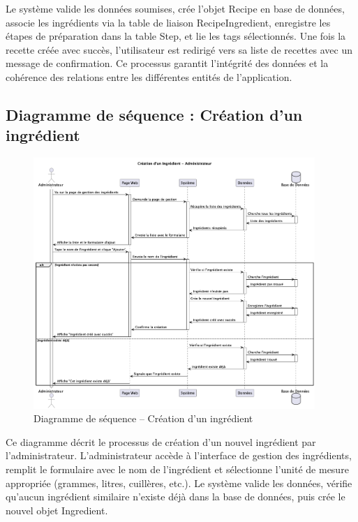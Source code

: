 \documentclass[12pt,a4paper]{report}
\begin{document}
Le système valide les données soumises, crée l'objet Recipe en base de données, associe les ingrédients via la table de liaison RecipeIngredient, enregistre les étapes de préparation dans la table Step, et lie les tags sélectionnés. Une fois la recette créée avec succès, l'utilisateur est redirigé vers sa liste de recettes avec un message de confirmation. Ce processus garantit l'intégrité des données et la cohérence des relations entre les différentes entités de l'application.

\subsection{Diagramme de séquence : Création d'un ingrédient}

\begin{figure}[H]
    \centering
    \includegraphics[width=0.95\textwidth]{sequence_diagram_creation_ingredient.png}
    \caption{Diagramme de séquence – Création d'un ingrédient}
    \label{fig:sequence_creation_ingredient}
\end{figure}

Ce diagramme décrit le processus de création d'un nouvel ingrédient par l'administrateur. L'administrateur accède à l'interface de gestion des ingrédients, remplit le formulaire avec le nom de l'ingrédient et sélectionne l'unité de mesure appropriée (grammes, litres, cuillères, etc.). Le système valide les données, vérifie qu'aucun ingrédient similaire n'existe déjà dans la base de données, puis crée le nouvel objet Ingredient.
\end{document}
